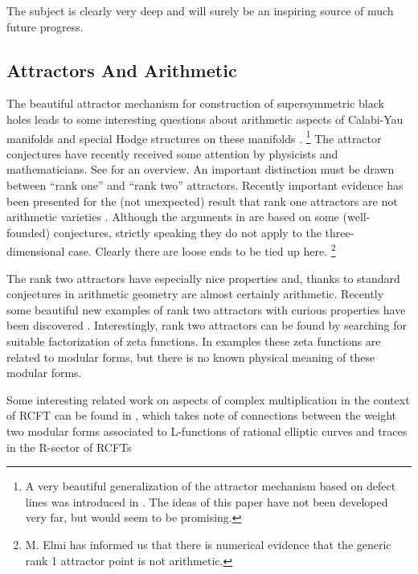 \documentclass[12pt]{article}
\begin{document}
{}The subject is clearly
very deep and  will surely be 
an inspiring  source of much future progress. 



\subsection{Attractors And Arithmetic}

The beautiful attractor mechanism for construction of
supersymmetric black holes \cite{Ferrara:1995ih}
leads to some interesting questions about arithmetic
aspects of Calabi-Yau manifolds and special Hodge
structures on these manifolds \cite{Moore:1998pn,Moore:1998zu,Moore:2004fg}.
%
\footnote{A very beautiful generalization of the 
attractor mechanism based on defect lines was introduced 
in \cite{Brunner:2010xm}. The ideas of this paper have not 
been developed very far, but would seem to be promising.}
%
The attractor conjectures  have recently received some
attention by physicists and mathematicians. See \cite{Benjamin:2018mdo} 
for an overview.  An important distinction 
must be drawn between ``rank one'' and ``rank two'' attractors. 
Recently important evidence has been presented for the (not unexpected) result that 
rank one attractors are not arithmetic varieties \cite{Lam:2020qge}. 
Although the arguments in \cite{Lam:2020qge} are based on some (well-founded) conjectures, 
strictly speaking they do not apply to the three-dimensional case. 
Clearly there are loose ends to be tied up here. 
%
\footnote{M. Elmi has informed us that there is numerical evidence that the generic rank 1 attractor point is not arithmetic.} 
%


The rank two attractors have especially nice
properties and, thanks to standard conjectures in arithmetic 
geometry are almost certainly arithmetic. 
Recently some beautiful new examples of rank two attractors
with curious properties have been discovered \cite{Candelas:2019llw}. Interestingly, rank two attractors can be found by searching for suitable factorization of zeta functions. In examples these zeta functions are related to modular forms, but there is no known physical meaning of these modular forms. 

Some interesting related work on aspects of 
complex multiplication in the context of RCFT can be found 
in \cite{Kondo:2018mha}, which takes note of   
connections between the weight two modular 
forms associated to L-functions of rational elliptic 
curves and traces in the R-sector of RCFTs 
\end{document}

